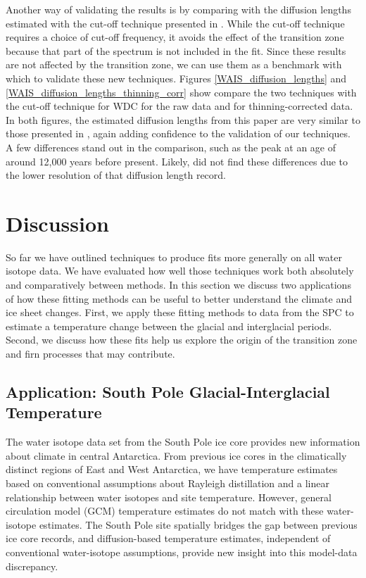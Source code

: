 \documentclass[draft, jgrga]{AGUTeX}
\begin{document}
\begin{article}
Another way of validating the results is by comparing with the diffusion lengths estimated with the cut-off technique presented in \cite{Jones2017a}. While the cut-off technique requires a choice of cut-off frequency, it avoids the effect of the transition zone because that part of the spectrum is not included in the fit. Since these results are not affected by the transition zone, we can use them as a benchmark with which to validate these new techniques. Figures \ref{WAIS_diffusion_lengths} and \ref{WAIS_diffusion_lengths_thinning_corr} show compare the two techniques with the cut-off technique for WDC for the raw data and for thinning-corrected data. In both figures, the estimated diffusion lengths from this paper are very similar to those presented in \cite{Jones2017a}, again adding confidence to the validation of our techniques. A few differences stand out in the comparison, such as the peak at an age of around 12,000 years before present. Likely, \cite{Jones2017a} did not find these differences due
to the lower resolution of that diffusion length record.


\section{Discussion}

So far we have outlined techniques to produce fits more generally on all water isotope data. We have evaluated how well those techniques work both absolutely and comparatively between methods. In this section we discuss two applications of how these fitting methods can be useful to better understand the climate and ice sheet changes. First, we apply these fitting methods to data from the SPC to estimate a temperature change between the glacial and interglacial periods. Second, we discuss how these fits help us explore the origin of the transition zone and firn processes that may contribute.

\subsection{Application: South Pole Glacial-Interglacial Temperature}

The water isotope data set from the South Pole ice core provides new information about climate in central Antarctica. From previous ice cores in the climatically distinct regions of East and West Antarctica, we have temperature estimates based on conventional assumptions about Rayleigh distillation and a linear relationship between water isotopes and site temperature. However, general circulation model (GCM) temperature estimates do not match with these water-isotope estimates. The South Pole site spatially bridges the gap between previous ice core records, and diffusion-based temperature estimates, independent of conventional water-isotope assumptions, provide new insight into this model-data discrepancy.


\end{article}
\end{document}
